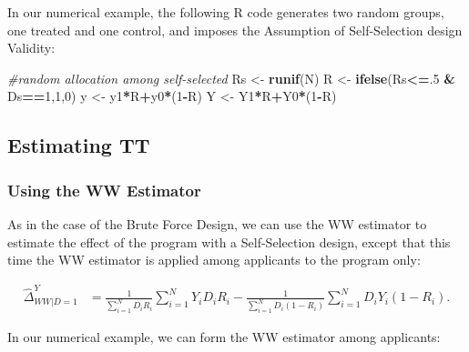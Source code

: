 \documentclass[]{book}
\newenvironment{Shaded}{\begin{snugshade}}{\end{snugshade}}
\newcommand{\KeywordTok}[1]{\textcolor[rgb]{0.13,0.29,0.53}{\textbf{#1}}}
\newcommand{\DecValTok}[1]{\textcolor[rgb]{0.00,0.00,0.81}{#1}}
\newcommand{\StringTok}[1]{\textcolor[rgb]{0.31,0.60,0.02}{#1}}
\newcommand{\CommentTok}[1]{\textcolor[rgb]{0.56,0.35,0.01}{\textit{#1}}}
\newcommand{\OperatorTok}[1]{\textcolor[rgb]{0.81,0.36,0.00}{\textbf{#1}}}
\newcommand{\NormalTok}[1]{#1}
\theoremstyle{definition}
\theoremstyle{definition}
\theoremstyle{definition}
\theoremstyle{remark}
\let\BeginKnitrBlock\begin \let\EndKnitrBlock\end
\begin{document}
\BeginKnitrBlock{example}
\protect\hypertarget{exm:unnamed-chunk-82}{}{\label{exm:unnamed-chunk-82}
}In our numerical example, the following R code generates two random
groups, one treated and one control, and imposes the Assumption of
Self-Selection design Validity:
\EndKnitrBlock{example}

\begin{Shaded}
\begin{Highlighting}[]
\CommentTok{#random allocation among self-selected}
\NormalTok{Rs <-}\StringTok{ }\KeywordTok{runif}\NormalTok{(N)}
\NormalTok{R <-}\StringTok{ }\KeywordTok{ifelse}\NormalTok{(Rs}\OperatorTok{<=}\NormalTok{.}\DecValTok{5} \OperatorTok{&}\StringTok{ }\NormalTok{Ds}\OperatorTok{==}\DecValTok{1}\NormalTok{,}\DecValTok{1}\NormalTok{,}\DecValTok{0}\NormalTok{)}
\NormalTok{y <-}\StringTok{ }\NormalTok{y1}\OperatorTok{*}\NormalTok{R}\OperatorTok{+}\NormalTok{y0}\OperatorTok{*}\NormalTok{(}\DecValTok{1}\OperatorTok{-}\NormalTok{R)}
\NormalTok{Y <-}\StringTok{ }\NormalTok{Y1}\OperatorTok{*}\NormalTok{R}\OperatorTok{+}\NormalTok{Y0}\OperatorTok{*}\NormalTok{(}\DecValTok{1}\OperatorTok{-}\NormalTok{R)}
\end{Highlighting}
\end{Shaded}

\subsection{Estimating TT}\label{estimating-tt}

\subsubsection{Using the WW Estimator}\label{using-the-ww-estimator-1}

As in the case of the Brute Force Design, we can use the WW estimator to
estimate the effect of the program with a Self-Selection design, except
that this time the WW estimator is applied among applicants to the
program only:

\begin{align*}
  \hat{\Delta}^Y_{WW|D=1} & = \frac{1}{\sum_{i=1}^N D_iR_i}\sum_{i=1}^N Y_iD_iR_i-\frac{1}{\sum_{i=1}^N D_i(1-R_i)}\sum_{i=1}^N D_iY_i(1-R_i).
\end{align*}

\BeginKnitrBlock{example}
\protect\hypertarget{exm:unnamed-chunk-83}{}{\label{exm:unnamed-chunk-83}
}In our numerical example, we can form the WW estimator among
applicants:
\EndKnitrBlock{example}
\end{document}
